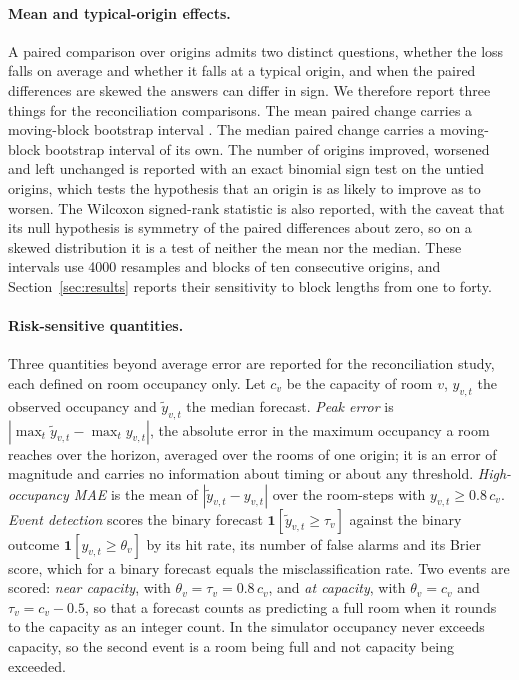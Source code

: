 \documentclass[utf8]{FrontiersinHarvard}
\newif\ifsecondrevisionmarkup
\newcommand{\rev}[1]{\ifsecondrevisionmarkup\textcolor{revisiontwo}{#1}\else#1\fi}
\theoremstyle{plain}
\theoremstyle{definition}
\theoremstyle{remark}
\begin{document}
\rev{\paragraph{Mean and typical-origin effects.} A paired comparison over origins admits two distinct questions, whether the loss falls on average and whether it falls at a typical origin, and when the paired differences are skewed the answers can differ in sign. We therefore report three things for the reconciliation comparisons. The mean paired change carries a moving-block bootstrap interval \citep{kunsch1989}. The median paired change carries a moving-block bootstrap interval of its own. The number of origins improved, worsened and left unchanged is reported with an exact binomial sign test on the untied origins, which tests the hypothesis that an origin is as likely to improve as to worsen. The Wilcoxon signed-rank statistic is also reported, with the caveat that its null hypothesis is symmetry of the paired differences about zero, so on a skewed distribution it is a test of neither the mean nor the median. These intervals use \num{4000} resamples and blocks of ten consecutive origins, and Section~\ref{sec:results} reports their sensitivity to block lengths from one to forty.}

\rev{\paragraph{Risk-sensitive quantities.} Three quantities beyond average error are reported for the reconciliation study, each defined on room occupancy only. Let $c_v$ be the capacity of room $v$, $y_{v,t}$ the observed occupancy and $\tilde{y}_{v,t}$ the median forecast. \emph{Peak error} is $|\max_{t}\tilde{y}_{v,t} - \max_{t} y_{v,t}|$, the absolute error in the maximum occupancy a room reaches over the horizon, averaged over the rooms of one origin; it is an error of magnitude and carries no information about timing or about any threshold. \emph{High-occupancy MAE} is the mean of $|\tilde{y}_{v,t} - y_{v,t}|$ over the room-steps with $y_{v,t} \ge 0.8\,c_v$. \emph{Event detection} scores the binary forecast $\mathbf{1}[\tilde{y}_{v,t} \ge \tau_v]$ against the binary outcome $\mathbf{1}[y_{v,t} \ge \theta_v]$ by its hit rate, its number of false alarms and its Brier score, which for a binary forecast equals the misclassification rate. Two events are scored: \emph{near capacity}, with $\theta_v = \tau_v = 0.8\,c_v$, and \emph{at capacity}, with $\theta_v = c_v$ and $\tau_v = c_v - 0.5$, so that a forecast counts as predicting a full room when it rounds to the capacity as an integer count. In the simulator occupancy never exceeds capacity, so the second event is a room being full and not capacity being exceeded.}
\end{document}
